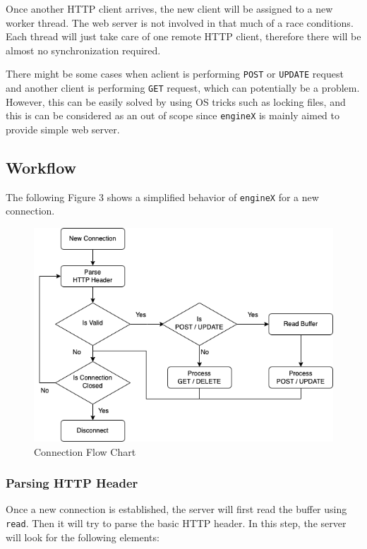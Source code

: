 \documentclass{homework}
\begin{document}
Once another HTTP client arrives, the new client will be assigned to a new worker thread. The web server is not involved in that much of a race conditions. Each thread will just take care of one remote HTTP client, therefore there will be almost no synchronization required. 

There might be some cases when aclient is performing \texttt{POST} or \texttt{UPDATE} request and another client is performing \texttt{GET} request, which can potentially be a problem. However, this can be easily solved by using OS tricks such as locking files, and this is can be considered as an out of scope since \texttt{engineX} is mainly aimed to provide simple web server.
\pagebreak

\subsection{Workflow}
The following Figure 3 shows a simplified behavior of \texttt{engineX} for a new connection.

\begin{figure}[h]
\begin{center}
\includegraphics[scale=0.6]{3_flow_chart.png}    
\caption{Connection Flow Chart}
\end{center}
\end{figure}

\subsubsection{Parsing HTTP Header}
Once a new connection is established, the server will first read the buffer using \texttt{read}. Then it will try to parse the basic HTTP header. In this step, the server will look for the following elements:
\end{document}
